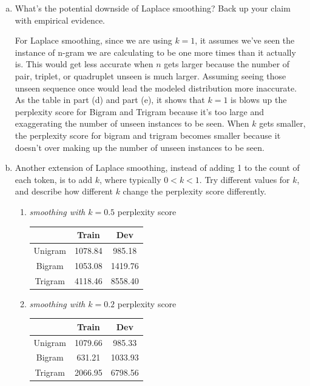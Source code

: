 \documentclass{article}
\newenvironment{solution}{\color{blue}}{}
\begin{document}
\begin{enumerate}[(a)]
  \item What's the potential downside of Laplace smoothing? Back up your claim with empirical evidence.
  
  \begin{solution}
    For Laplace smoothing, since we are using $k = 1$, it assumes we've seen the instance of 
    n-gram we are calculating to be one more times than it actually is. This would get less 
    accurate when $n$ gets larger because the number of pair, triplet, or quadruplet unseen 
    is much larger. Assuming seeing those unseen sequence once would lead the modeled distribution
    more inaccurate. As the table in part (d) and part (e), it shows that $k=1$ is blows up 
    the perplexity score for Bigram and Trigram because it's too large and exaggerating 
    the number of unseen instances to be seen. When $k$ gets smaller, the perplexity score 
    for bigram and trigram becomes smaller because it doesn't over making up the number of unseen 
    instances to be seen.
  \end{solution}

  \item Another extension of Laplace smoothing, instead of adding 1 to the count of each token, 
  is to add $k$, where typically $0 < k < 1$. Try different values for $k$, and describe how 
  different $k$ change the perplexity score differently.

  \begin{solution}
    \begin{enumerate}[1.]
      \item \textit{smoothing with $k = 0.5$} perplexity score
      \begin{center}
        \begin{tabular}{| c | c | c |}
          \hline
          & Train & Dev \\ \hline
          Unigram & 1078.84 & 985.18 \\ \hline
          Bigram & 1053.08 & 1419.76 \\ \hline
          Trigram & 4118.46 & 8558.40 \\ \hline
        \end{tabular}
      \end{center}

      \item \textit{smoothing with $k = 0.2$} perplexity score
      \begin{center}
        \begin{tabular}{| c | c | c |}
          \hline
          & Train & Dev \\ \hline
          Unigram & 1079.66 & 985.33 \\ \hline
          Bigram & 631.21 & 1033.93 \\ \hline
          Trigram & 2066.95 & 6798.56 \\ \hline
        \end{tabular}
      \end{center}


\end{enumerate}
\end{solution}
\end{enumerate}
\end{document}
